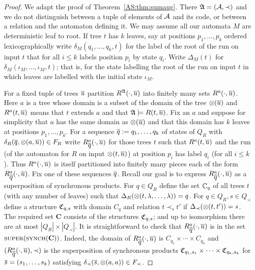 \begin{proof}
We adapt the proof of Theorem~\ref{AS:thm:sumaug}. There $\mathfrak{A} = ({\mathcal A},\prec)$ and we do not distinguish between a tuple of elements of ${\mathcal A}$ and its code, or between a relation and the automaton defining it. We may assume all our automata $M$ are deterministic leaf to root.
If tree $t$ has $k$ leaves, say at positions $p_1,\dots,p_k$ ordered lexicographically write $\delta_M(q_1,\dots,q_k,t)$ 
for the label of the root of the run on input $t$ that for all $i \leq k$ labels position $p_i$ by state $q_i$. Write $\Delta_M(t)$ for $\delta_M(\iota_M,\dots,\iota_M,t)$; that is, for the state labelling the root of the run on input $t$ in which leaves are labelled with the initial state $\iota_M$.

For a fixed tuple of trees $\mbox{$\overline {u}$}$ partition $R^{\mathfrak{A}}(\cdot,\mbox{$\overline {u}$})$ into finitely many sets $R^a(\cdot,\mbox{$\overline {u}$})$. Here $a$ is a tree whose domain is a subset of the domain of the tree $\otimes(\mbox{$\overline {u}$})$ and $R^a(t,\mbox{$\overline {u}$})$ means that $t$ extends $a$ and that $\mathfrak{A} \models R(t,\mbox{$\overline {u}$})$. Fix an $a$ and suppose for simplicity that $a$ has the same domain as $\otimes(\mbox{$\overline {u}$})$ and that this domain has $k$ leaves at positions $p_1,\dots,p_k$. For a sequence $\mbox{$\overline {q}$} := q_1,\dots,q_k$ of states of $Q_R$ with  $\delta_R(\mbox{$\overline {q}$},\otimes(a,\mbox{$\overline {u}$})) \in F_R$ write
$R^a_{\mbox{$\overline {q}$}}(\cdot,\mbox{$\overline {u}$})$ for those trees $t$ such that $R^a(t,\mbox{$\overline {u}$})$ and the run (of the automaton for $R$ on input $\otimes(t,\mbox{$\overline {u}$})$) 
at position $p_i$ has label $q_i$ (for all $i \leq k$). Thus $R^a(\cdot,\mbox{$\overline {u}$})$ is itself partitioned into finitely many pieces each of the form $R^a_{\mbox{$\overline {q}$}}(\cdot,\mbox{$\overline {u}$})$. Fix one of these sequences $\mbox{$\overline {q}$}$. Recall our goal is to express $R^a_{\mbox{$\overline {q}$}}(\cdot,\mbox{$\overline {u}$})$ as a superposition of synchronous products. For $q \in Q_R$ define the set $\mathbb{C}_q$ of all trees $t$ (with any number of leaves) such that $\Delta_R(\otimes(t,\lambda,\dots,\lambda)) = q$.
For $q \in Q_R, s \in Q_{\prec}$ define a structure $\mathfrak{C}_{q,s}$ with domain $C_q$ and relation $t \prec_s t'$ if $\Delta_{\prec}(\otimes(t,t')) = s$.
The required set $\mathbf{C}$ consists of the structures $\mathfrak{C}_{q,s}$; and up to isomorphism there are at most $|Q_R| \times |Q_{\prec}|$. It is straightforward to check that $R^a_{\mbox{$\overline {q}$}}(\cdot,\mbox{$\overline {u}$})$ is in the set $\textsc{super}(\textsc{synch}(\textbf{C}))$. Indeed, the domain of $R^a_{\mbox{$\overline {q}$}}(\cdot,\mbox{$\overline {u}$})$ is $C_{q_1} \times \cdots \times C_{q_k}$ and $(R^a_{\mbox{$\overline {q}$}}(\cdot,\mbox{$\overline {u}$}),\prec)$ is the superposition of synchronous products $\mathfrak{C}_{q_1,s_1} \times \cdots \times \mathfrak{C}_{q_k,s_k}$ for $\mbox{$\overline {s}$} = (s_1,\dots,s_k)$ satisfying $\delta_\prec(\mbox{$\overline {s}$},\otimes(a,a)) \in F_\prec$.
\end{proof}

